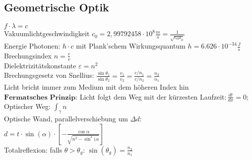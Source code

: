 \documentclass[fs, footer]{latex4ei}
\begin{document}
\begin{multicols*}{4}
\subsection{Geometrische Optik}
$f\cdot\lambda = c$\\
Vakuumlichtgeschwindigkeit $c_0=2,99792458\cdot 10^8 \frac{m}{s} = \frac{1}{\sqrt{\epsilon_0 \mu_0}}$\\
Energie Photonen: $h\cdot c$ mit Plank'schem Wirkungsquantum $h=6.626\cdot10^{-34}\frac{J}{s}$\\
Brechungsindex $n = \frac{c}{v}$\\
Dielektrizitätskonstante $\varepsilon = n^2 $\\
 Brechungsgesetz von Snellius: $\frac{\sin\theta_1}{\sin\theta_2} = \frac{v_1}{v_2}  = \frac{c/n_1}{c/n_2} = \frac{n_2}{n_1}$\\
Licht bricht immer zum Medium mit dem höheren Index hin\\
$\textbf{Fermatsches Prinzip}$: Licht folgt dem Weg mit der kürzesten Laufzeit$: \frac{dt}{dx} = 0$; Optischer Weg: $\int_{\gamma}n$\\
Optische Wand, parallelverschiebung um $\Delta d:$\\$d = t\cdot\sin(\alpha)\cdot\left[-\frac{\cos\alpha}{\sqrt{n^2- \sin ^2(\alpha}}\right]$\\
Totalreflexion: falls $\theta>\theta_g$: $\sin(\theta_g) = \frac{n_2}{n_1}$\\


\end{multicols*}
\end{document}
